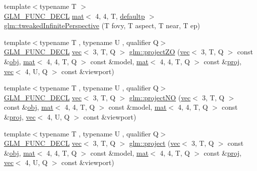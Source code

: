 \begin{DoxyCompactItemize}
\item 
{\footnotesize template$<$typename T $>$ }\\\mbox{\hyperlink{setup_8hpp_ab2d052de21a70539923e9bcbf6e83a51}{G\+L\+M\+\_\+\+F\+U\+N\+C\+\_\+\+D\+E\+CL}} \mbox{\hyperlink{structglm_1_1mat}{mat}}$<$ 4, 4, T, \mbox{\hyperlink{namespaceglm_a36ed105b07c7746804d7fdc7cc90ff25a9d21ccd8b5a009ec7eb7677befc3bf51}{defaultp}} $>$ \mbox{\hyperlink{group__gtc__matrix__transform_gaf5b3c85ff6737030a1d2214474ffa7a8}{glm\+::tweaked\+Infinite\+Perspective}} (T fovy, T aspect, T near, T ep)
\item 
{\footnotesize template$<$typename T , typename U , qualifier Q$>$ }\\\mbox{\hyperlink{setup_8hpp_ab2d052de21a70539923e9bcbf6e83a51}{G\+L\+M\+\_\+\+F\+U\+N\+C\+\_\+\+D\+E\+CL}} \mbox{\hyperlink{structglm_1_1vec}{vec}}$<$ 3, T, Q $>$ \mbox{\hyperlink{group__gtc__matrix__transform_ga77d157525063dec83a557186873ee080}{glm\+::project\+ZO}} (\mbox{\hyperlink{structglm_1_1vec}{vec}}$<$ 3, T, Q $>$ const \&\mbox{\hyperlink{_s_d_l__opengl__glext_8h_a0c0d4701a6c89f4f7f0640715d27ab26}{obj}}, \mbox{\hyperlink{structglm_1_1mat}{mat}}$<$ 4, 4, T, Q $>$ const \&model, \mbox{\hyperlink{structglm_1_1mat}{mat}}$<$ 4, 4, T, Q $>$ const \&\mbox{\hyperlink{group__gtx__projection_ga58384b7170801dd513de46f87c7fb00e}{proj}}, \mbox{\hyperlink{structglm_1_1vec}{vec}}$<$ 4, U, Q $>$ const \&viewport)
\item 
{\footnotesize template$<$typename T , typename U , qualifier Q$>$ }\\\mbox{\hyperlink{setup_8hpp_ab2d052de21a70539923e9bcbf6e83a51}{G\+L\+M\+\_\+\+F\+U\+N\+C\+\_\+\+D\+E\+CL}} \mbox{\hyperlink{structglm_1_1vec}{vec}}$<$ 3, T, Q $>$ \mbox{\hyperlink{group__gtc__matrix__transform_ga05249751f48d14cb282e4979802b8111}{glm\+::project\+NO}} (\mbox{\hyperlink{structglm_1_1vec}{vec}}$<$ 3, T, Q $>$ const \&\mbox{\hyperlink{_s_d_l__opengl__glext_8h_a0c0d4701a6c89f4f7f0640715d27ab26}{obj}}, \mbox{\hyperlink{structglm_1_1mat}{mat}}$<$ 4, 4, T, Q $>$ const \&model, \mbox{\hyperlink{structglm_1_1mat}{mat}}$<$ 4, 4, T, Q $>$ const \&\mbox{\hyperlink{group__gtx__projection_ga58384b7170801dd513de46f87c7fb00e}{proj}}, \mbox{\hyperlink{structglm_1_1vec}{vec}}$<$ 4, U, Q $>$ const \&viewport)
\item 
{\footnotesize template$<$typename T , typename U , qualifier Q$>$ }\\\mbox{\hyperlink{setup_8hpp_ab2d052de21a70539923e9bcbf6e83a51}{G\+L\+M\+\_\+\+F\+U\+N\+C\+\_\+\+D\+E\+CL}} \mbox{\hyperlink{structglm_1_1vec}{vec}}$<$ 3, T, Q $>$ \mbox{\hyperlink{group__gtc__matrix__transform_gaf36e96033f456659e6705472a06b6e11}{glm\+::project}} (\mbox{\hyperlink{structglm_1_1vec}{vec}}$<$ 3, T, Q $>$ const \&\mbox{\hyperlink{_s_d_l__opengl__glext_8h_a0c0d4701a6c89f4f7f0640715d27ab26}{obj}}, \mbox{\hyperlink{structglm_1_1mat}{mat}}$<$ 4, 4, T, Q $>$ const \&model, \mbox{\hyperlink{structglm_1_1mat}{mat}}$<$ 4, 4, T, Q $>$ const \&\mbox{\hyperlink{group__gtx__projection_ga58384b7170801dd513de46f87c7fb00e}{proj}}, \mbox{\hyperlink{structglm_1_1vec}{vec}}$<$ 4, U, Q $>$ const \&viewport)

\end{DoxyCompactItemize}
